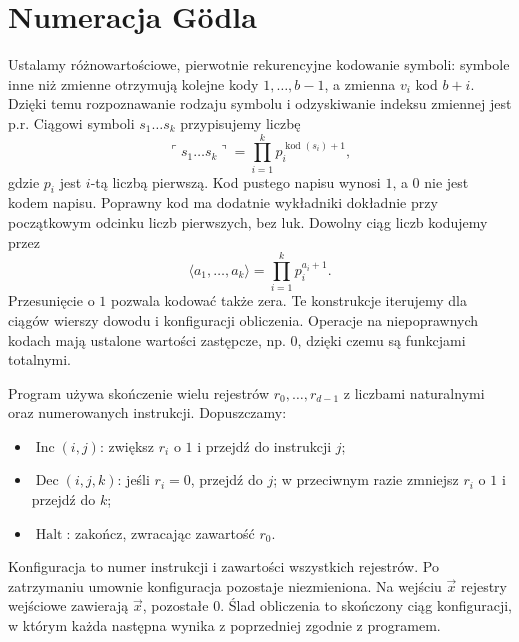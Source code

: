 \section{Numeracja Gödla}\label{sec:numeracja-godla}
\begin{definicja}\label{res:6:1}
Ustalamy różnowartościowe, pierwotnie rekurencyjne kodowanie symboli: symbole inne niż zmienne otrzymują kolejne kody $1,\ldots,b-1$, a zmienna $v_i$ kod $b+i$. Dzięki temu rozpoznawanie rodzaju symbolu i odzyskiwanie indeksu zmiennej jest p.r. Ciągowi symboli $s_1\ldots s_k$ przypisujemy liczbę
\[
\ulcorner s_1\ldots s_k\urcorner=\prod_{i=1}^k p_i^{\operatorname{kod}(s_i)+1},
\]
gdzie $p_i$ jest $i$-tą liczbą pierwszą. Kod pustego napisu wynosi $1$, a $0$ nie jest kodem napisu. Poprawny kod ma dodatnie wykładniki dokładnie przy początkowym odcinku liczb pierwszych, bez luk. Dowolny ciąg liczb kodujemy przez
\[
\langle a_1,\ldots,a_k\rangle=\prod_{i=1}^k p_i^{a_i+1}.
\]
Przesunięcie o $1$ pozwala kodować także zera. Te konstrukcje iterujemy dla ciągów wierszy dowodu i konfiguracji obliczenia. Operacje na niepoprawnych kodach mają ustalone wartości zastępcze, np. $0$, dzięki czemu są funkcjami totalnymi.
\end{definicja}

\begin{definicja}\label{res:6:2}
Program używa skończenie wielu rejestrów $r_0,\ldots,r_{d-1}$ z liczbami naturalnymi oraz numerowanych instrukcji. Dopuszczamy:
\begin{itemize}
\item $\operatorname{Inc}(i,j)$: zwiększ $r_i$ o $1$ i przejdź do instrukcji $j$;
\item $\operatorname{Dec}(i,j,k)$: jeśli $r_i=0$, przejdź do $j$; w przeciwnym razie zmniejsz $r_i$ o $1$ i przejdź do $k$;
\item $\operatorname{Halt}$: zakończ, zwracając zawartość $r_0$.
\end{itemize}
Konfiguracja to numer instrukcji i zawartości wszystkich rejestrów. Po zatrzymaniu umownie konfiguracja pozostaje niezmieniona. Na wejściu $\vec x$ rejestry wejściowe zawierają $\vec x$, pozostałe $0$. Ślad obliczenia to skończony ciąg konfiguracji, w którym każda następna wynika z poprzedniej zgodnie z programem.
\end{definicja}


